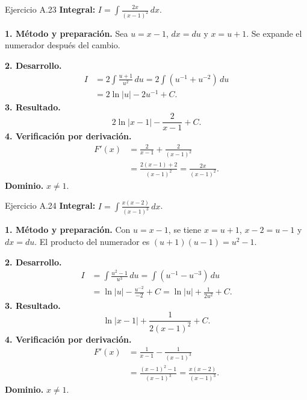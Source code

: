 \begin{examplebox}{Ejercicio A.23}
\textbf{Integral:} $\displaystyle I=\int \frac{2x}{(x-1)^2}\,dx$.

\textbf{1. Método y preparación.} Sea $u=x-1$, $dx=du$ y $x=u+1$. Se expande el numerador después del cambio.

\textbf{2. Desarrollo.}
\begin{align*}
I&=2\int\frac{u+1}{u^2}\,du=2\int(u^{-1}+u^{-2})\,du\\&=2\ln|u|-2u^{-1}+C.
\end{align*}
\textbf{3. Resultado.}
\[
2\ln|x-1|-\frac2{x-1}+C.
\]
\textbf{4. Verificación por derivación.}
\begin{align*}
F'(x)&=\frac2{x-1}+\frac2{(x-1)^2}\\&=\frac{2(x-1)+2}{(x-1)^2}=\frac{2x}{(x-1)^2}.
\end{align*}
\textbf{Dominio.} $x\ne1$.
\end{examplebox}

\begin{examplebox}{Ejercicio A.24}
\textbf{Integral:} $\displaystyle I=\int \frac{x(x-2)}{(x-1)^3}\,dx$.

\textbf{1. Método y preparación.} Con $u=x-1$, se tiene $x=u+1$, $x-2=u-1$ y $dx=du$. El producto del numerador es $(u+1)(u-1)=u^2-1$.

\textbf{2. Desarrollo.}
\begin{align*}
I&=\int\frac{u^2-1}{u^3}\,du=\int(u^{-1}-u^{-3})\,du\\&=\ln|u|-\frac{u^{-2}}{-2}+C=\ln|u|+\frac1{2u^2}+C.
\end{align*}
\textbf{3. Resultado.}
\[
\ln|x-1|+\frac1{2(x-1)^2}+C.
\]
\textbf{4. Verificación por derivación.}
\begin{align*}
F'(x)&=\frac1{x-1}-\frac1{(x-1)^3}\\&=\frac{(x-1)^2-1}{(x-1)^3}=\frac{x(x-2)}{(x-1)^3}.
\end{align*}
\textbf{Dominio.} $x\ne1$.
\end{examplebox}

